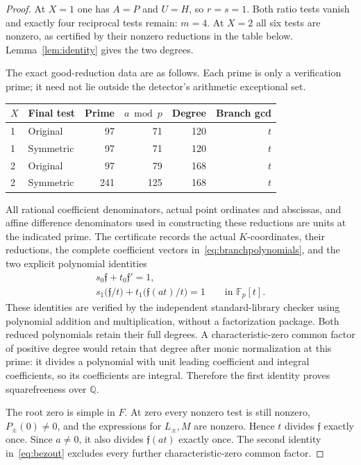\documentclass[11pt,a4paper]{article}
\newcommand{\Q}{\mathbb Q}
\begin{document}
\begin{proof}
At $X=1$ one has $A=P$ and $U=H$, so $r=s=1$. Both ratio tests
vanish and exactly four reciprocal tests remain: $m=4$. At $X=2$
all six tests are nonzero, as certified by their nonzero reductions
in the table below. Lemma~\ref{lem:identity} gives the two degrees.

The exact good-reduction data are as follows. Each prime is only a
verification prime; it need not lie outside the detector's arithmetic
exceptional set.
\begin{center}
\begin{tabular}{llrrrr}\toprule
$X$ & Final test & Prime & $a\bmod p$ & Degree & Branch gcd\\\midrule
1 & Original & 97 & 71 & 120 & $t$\\
1 & Symmetric & 97 & 71 & 120 & $t$\\
2 & Original & 97 & 79 & 168 & $t$\\
2 & Symmetric & 241 & 125 & 168 & $t$\\\bottomrule
\end{tabular}
\end{center}
All rational coefficient denominators, actual point ordinates and
abscissas, and affine difference denominators used in constructing
these reductions are units at the indicated prime. The certificate
records the actual $K$-coordinates, their reductions, the complete
coefficient vectors in~\eqref{eq:branchpolynomials}, and the two
explicit polynomial identities
\begin{equation}\label{eq:bezout}
\begin{gathered}
 s_0\mathfrak f+t_0\mathfrak f'=1,\\
 s_1\bigl(\mathfrak f/t\bigr)
       +t_1\bigl(\mathfrak f(at)/t\bigr)=1
                         \qquad\text{in }\mathbb F_p[t].
\end{gathered}
\end{equation}
These identities are verified by the independent standard-library
checker using polynomial addition and multiplication, without a
factorization package. Both reduced polynomials retain their full
degrees. A characteristic-zero common factor of positive degree
would retain that degree after monic normalization at this prime:
it divides a polynomial with unit leading coefficient and integral
coefficients, so its coefficients are integral. Therefore the first
identity proves squarefreeness over $\Q$.

The root zero is simple in $F$. At zero every nonzero test is still
nonzero, $P_\pm(0)\ne0$, and the expressions for $L_\pm,M$ are
nonzero. Hence $t$ divides $\mathfrak f$ exactly once. Since
$a\ne0$, it also divides $\mathfrak f(at)$ exactly once. The second
identity in~\eqref{eq:bezout} excludes every further
characteristic-zero common factor.


\end{proof}
\end{document}
